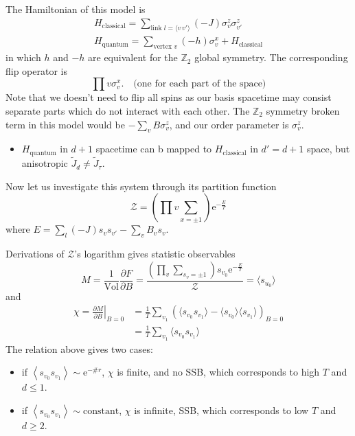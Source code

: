 The Hamiltonian of this model is
\begin{equation}
  \begin{gathered}
  H_{\text{classical}} = \sum_{\text{link $l=\langle v\,v' \rangle$}} (-J) \sigma _{v}^{z} \sigma _{v'}^{z}
  \\
  H_{\text{quantum}} = \sum_{\text{vertex $v$}} (-h) \sigma _{v}^{x}+ H_{\text{classical}}
  \end{gathered}
\end{equation}
in which $h$ and $-h$ are equivalent for the $\mathbb{Z}_2$ global symmetry. The corresponding flip operator is
\begin{equation}
  \prod{v} \sigma _{v}^{x}. \quad \text{(one for each part of the space)}
\end{equation}
Note that we doesn't need to flip all spins as our basis spacetime may consist separate parts which do not interact with each other.
The $\mathbb{Z}_2$ symmetry broken term in this model would be $- \sum_{v} B \sigma _{v}^{z}$, and our order parameter is $\sigma _{v}^{z}$.
\begin{itemize}
  \item $H_{\text{quantum}}$ in $d+1$ spacetime can b mapped to $H_{\text{classical}}$ in $d'=d+1$ space, but anisotropic $\tilde{J}_{d}\neq \tilde{J}_{\tau }$.
\end{itemize}

Now let us investigate this system through its partition function
\begin{equation}
  \mathcal{Z} = \left( \prod{v} \sum_{x=\pm 1}  \right)\mathrm{e}^{-\frac{E}{T}}
\end{equation}
where $E = \sum_{l} (-J) s_v s_{v'} - \sum_{v} B_v s_v$. 

Derivations of $\mathcal{Z}$'s logarithm gives statistic observables
\begin{equation}
  M = \frac{1}{\text{Vol}} \frac{\partial F}{\partial B} = \frac{\left( \prod_{v} \sum_{s_v = \pm 1}  \right) s_{v_0} \mathrm{e}^{-\frac{E}{T}}}{\mathcal{Z}} = \langle s_{u_0}\rangle
\end{equation}
and
\begin{equation}
  \begin{aligned}
    \chi = \left. \frac{\partial M}{\partial B} \right|_{B=0} 
    & = \frac{1}{T} \sum_{v_1} \left( \langle s_{v_0} s_{v_1} \rangle - \langle s_{v_0}\rangle \langle s_{v_1}\rangle \right)_{B=0} \\
    & = \frac{1}{T} \sum_{v_1} \langle s_{v_0} s_{v_1}\rangle
  \end{aligned}
\end{equation}
The relation above gives two cases:
\begin{itemize}
  \item if $\left< s_{v_0} s_{v_1} \right> \sim \mathrm{e}^{- \# r}$, $\chi$ is finite, and no SSB, which corresponds to high $T$ and $d \le 1$.
  \item if $\left< s_{v_0} s_{v_1} \right> \sim \text{constant}$, $\chi$ is infinite, SSB, which corresponds to low $T$ and $d \ge 2$.
\end{itemize}

